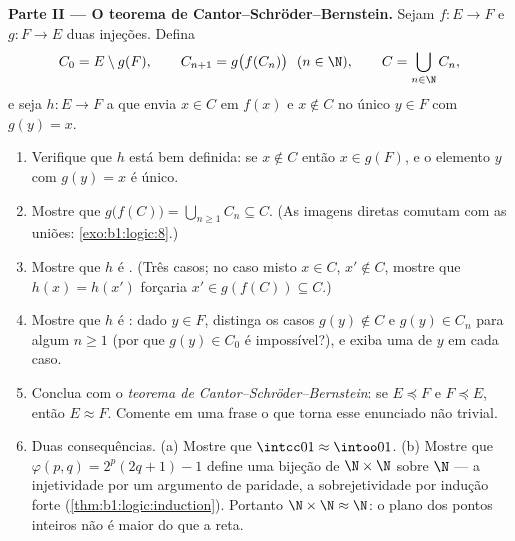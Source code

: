 \begin{problem}
\medskip
\noindent\textbf{Parte II --- O teorema de
Cantor--Schröder--Bernstein.} Sejam $f \colon E \to F$ e $g \colon F \to E$ duas
injeções. Defina
\[
C_0 = E \setminus g(F), \qquad C_{n+1} = g\bigl(f(C_n)\bigr)
\ \ (n \in \N), \qquad C = \bigcup_{n \in \N} C_n,
\]
e seja $h \colon E \to F$ a  que envia $x \in C$ em $f(x)$ e $x \notin C$
no único $y \in F$ com $g(y) = x$.
\begin{enumerate}
  \item Verifique que $h$ está bem definida: se $x \notin C$ então $x \in
        g(F)$, e o elemento $y$ com $g(y) = x$ é único.
  \item Mostre que $g\bigl(f(C)\bigr) = \bigcup_{n \geq 1} C_n
        \subseteq C$. (As imagens diretas comutam com as uniões:
        \cref{exo:b1:logic:8}.)
  \item Mostre que $h$ é . (Três casos; no caso misto
        $x \in C$, $x' \notin C$, mostre que $h(x) = h(x')$ forçaria
        $x' \in g(f(C)) \subseteq C$.)
  \item Mostre que $h$ é : dado $y \in F$, distinga
        os casos $g(y) \notin C$ e $g(y) \in C_n$ para algum $n
        \geq 1$ (por que $g(y) \in C_0$ é impossível?), e exiba uma
         de $y$ em cada caso.
  \item Conclua com o \emph{teorema de Cantor--Schröder--Bernstein}: se
        $E \preceq F$ e $F \preceq E$, então $E
        \approx F$. Comente em uma frase o que torna esse
        enunciado não trivial.
  \item Duas consequências. (a) Mostre que $\intcc01 \approx \intoo01$.
        (b) Mostre que $\varphi(p, q) = 2^p(2q + 1) - 1$ define uma
        bijeção de $\N \times \N$ sobre $\N$ --- a injetividade por um
        argumento de paridade, a sobrejetividade por indução forte
        (\cref{thm:b1:logic:induction}). Portanto $\N \times \N \approx
        \N$: o plano dos pontos inteiros não é maior do que a
        reta.
\end{enumerate}


\end{problem}
